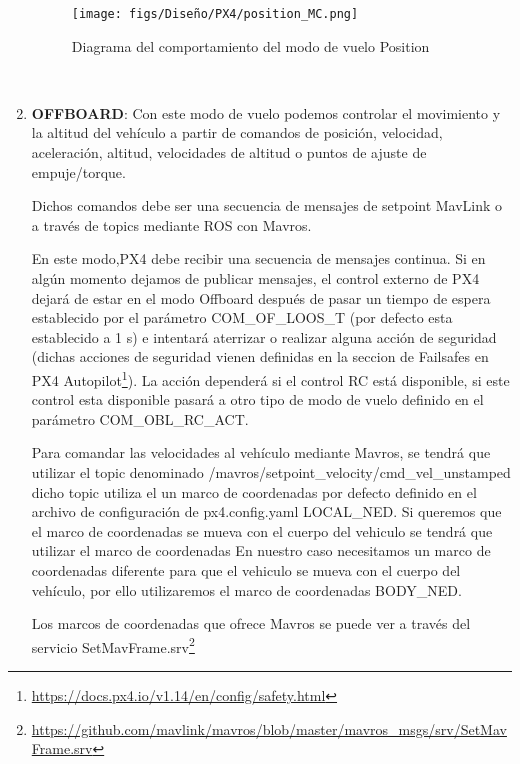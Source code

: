\begin{enumerate}
    \begin{figure} [H]
      \begin{center}
        \texttt{[image: figs/Diseño/PX4/position\_MC.png]}
      \end{center}
      \caption{Diagrama del comportamiento del modo de vuelo Position}
      \label{fig:position_mode_px4}
    \end{figure}\

    \item \textbf{OFFBOARD}: Con este modo de vuelo podemos controlar el movimiento y la altitud del vehículo a partir de comandos de posición, velocidad, aceleración, altitud, velocidades de 
    altitud o puntos de ajuste de empuje/torque. 

    Dichos comandos debe ser una secuencia de mensajes de setpoint MavLink o a través de topics mediante ROS con Mavros.

    En este modo,PX4 debe recibir una secuencia de mensajes continua. Si en algún momento dejamos de publicar mensajes, el control externo de PX4 dejará de estar en el modo Offboard después
    de pasar un tiempo de espera establecido por el parámetro COM\_OF\_LOOS\_T (por defecto esta establecido a 1 s) e intentará aterrizar o realizar alguna acción de seguridad (dichas acciones 
    de seguridad vienen definidas en la seccion de Failsafes en PX4 Autopilot\footnote{\url{https://docs.px4.io/v1.14/en/config/safety.html}}). La acción dependerá
    si el control RC está disponible, si este control esta disponible pasará a otro tipo de modo de vuelo definido en el parámetro COM\_OBL\_RC\_ACT. 

    Para comandar las velocidades al vehículo mediante Mavros, se tendrá que utilizar el topic denominado /mavros/setpoint\_velocity/cmd\_vel\_unstamped dicho topic utiliza el un marco de coordenadas
    por defecto definido en el archivo de configuración de px4.config.yaml  LOCAL\_NED. Si queremos que el marco de coordenadas se mueva con el 
    cuerpo del vehiculo se tendrá que utilizar el marco de coordenadas
    En nuestro caso necesitamos un marco de coordenadas diferente para que el vehiculo se mueva
    con el cuerpo del vehículo, por ello utilizaremos el marco de coordenadas BODY\_NED. 

    Los marcos de coordenadas que ofrece Mavros se puede ver a través del servicio SetMavFrame.srv\footnote{\url{https://github.com/mavlink/mavros/blob/master/mavros_msgs/srv/SetMavFrame.srv}}
  \end{enumerate}

